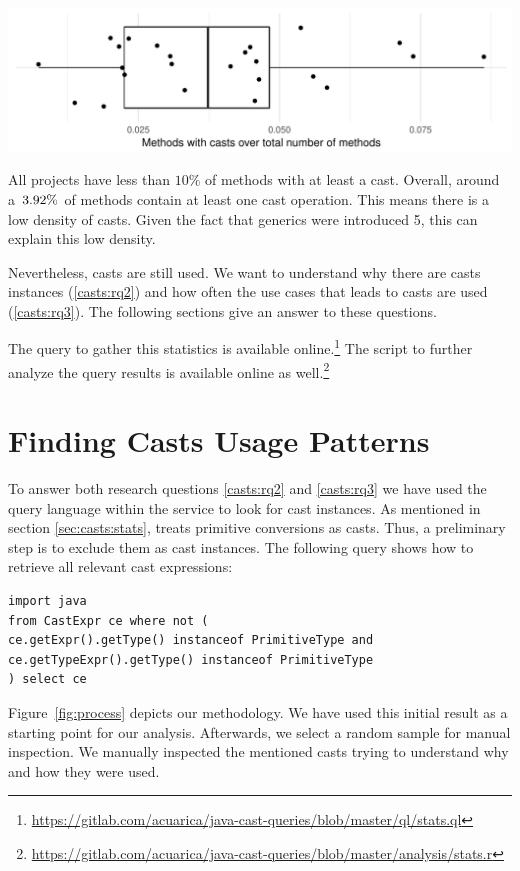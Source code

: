 \includegraphics[width=\columnwidth]{stats-methodwcast.pdf}

All projects have less than $10\%$ of methods with at least a cast.
Overall, around a~$3.92\%{}$ of methods contain at least one cast operation. 
This means there is a low density of casts.
Given the fact that generics were introduced \java{} 5, this can explain this low density.

Nevertheless, casts are still used.
We want to understand why there are casts instances (\ref{casts:rq2}) and how often the use cases that leads to casts are used (\ref{casts:rq3}).
The following sections give an answer to these questions.

The query to gather this statistics is available online.\footnote{\url{https://gitlab.com/acuarica/java-cast-queries/blob/master/ql/stats.ql}}
The  script to further analyze the query results is available online as well.\footnote{\url{https://gitlab.com/acuarica/java-cast-queries/blob/master/analysis/stats.r}}


\section{Finding Casts Usage Patterns}
\label{sec:casts:methodology}

To answer both research questions \ref{casts:rq2} and \ref{casts:rq3} we have used the \ql{} query language within the \lgtm{} service to look for cast instances.
As mentioned in section \ref{sec:casts:stats}, \ql{} treats primitive conversions as casts.
Thus, a preliminary step is to exclude them as cast instances.
The following \ql{} query shows how to retrieve all relevant cast expressions:

\begin{lstlisting}[style=ql,caption=\ql{} query to retrieve all relevant cast expressions.]
import java
from CastExpr ce where not (
ce.getExpr().getType() instanceof PrimitiveType and
ce.getTypeExpr().getType() instanceof PrimitiveType
) select ce
\end{lstlisting}

Figure~\ref{fig:process} depicts our methodology.
We have used this initial result as a starting point for our analysis.
Afterwards, we select a random sample for manual inspection.
We manually inspected the mentioned casts trying to understand why and how they were used.

